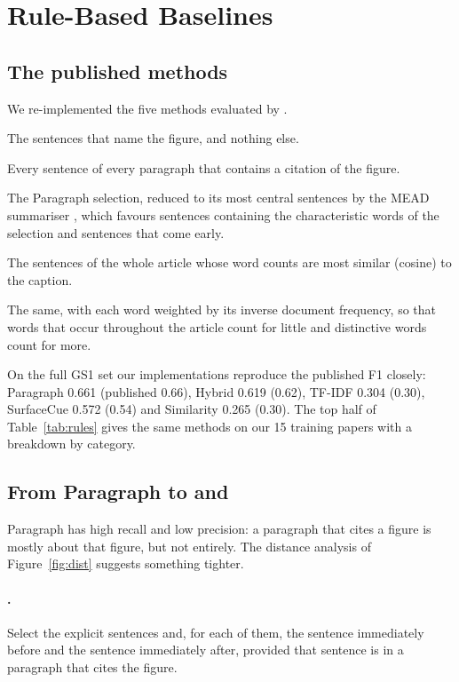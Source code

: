 \section{Rule-Based Baselines}
\label{sec:rules}

\subsection{The published \figsum{} methods}
\label{sec:figsumbase}
We re-implemented the five methods evaluated by \citet{ramesh2015figsum}.
\begin{description}[leftmargin=1.2em,style=nextline,itemsep=2pt]
  \item[SurfaceCue] The sentences that name the figure, and nothing else.
  \item[Paragraph] Every sentence of every paragraph that contains a citation of the figure.
  \item[Hybrid] The Paragraph selection, reduced to its most central sentences by the MEAD summariser
        \citep{radev2004mead}, which favours sentences containing the characteristic words of the selection
        and sentences that come early.
  \item[Similarity] The sentences of the whole article whose word counts are most similar (cosine) to the
        caption.
  \item[TF-IDF] The same, with each word weighted by its inverse document frequency, so that words that occur
        throughout the article count for little and distinctive words count for more.
\end{description}
On the full GS1 set our implementations reproduce the published F1 closely: Paragraph 0.661 (published 0.66),
Hybrid 0.619 (0.62), TF-IDF 0.304 (0.30), SurfaceCue 0.572 (0.54) and Similarity 0.265 (0.30). The top half of
Table~\ref{tab:rules} gives the same methods on our 15 training papers with a breakdown by category.

\subsection{From Paragraph to \bz{} and \bof{}}
Paragraph has high recall and low precision: a paragraph that cites a figure is mostly about that figure, but
not entirely. The distance analysis of Figure~\ref{fig:dist} suggests something tighter.

\paragraph{\bz{}.} Select the explicit sentences and, for each of them, the sentence immediately before and
the sentence immediately after, provided that sentence is in a paragraph that cites the figure.

